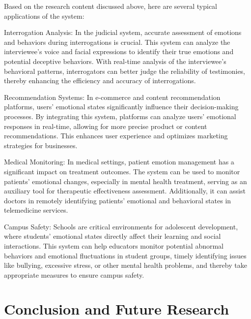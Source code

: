 \documentclass[preprint,12pt]{elsarticle}
\begin{document}
Based on the research content discussed above, here are several typical applications of the system:

Interrogation Analysis: In the judicial system, accurate assessment of emotions and behaviors during interrogations is crucial. This system can analyze the interviewee's voice and facial expressions to identify their true emotions and potential deceptive behaviors. With real-time analysis of the interviewee’s behavioral patterns, interrogators can better judge the reliability of testimonies, thereby enhancing the efficiency and accuracy of interrogations.

Recommendation Systems: In e-commerce and content recommendation platforms, users' emotional states significantly influence their decision-making processes. By integrating this system, platforms can analyze users' emotional responses in real-time, allowing for more precise product or content recommendations. This enhances user experience and optimizes marketing strategies for businesses.

Medical Monitoring: In medical settings, patient emotion management has a significant impact on treatment outcomes. The system can be used to monitor patients' emotional changes, especially in mental health treatment, serving as an auxiliary tool for therapeutic effectiveness assessment. Additionally, it can assist doctors in remotely identifying patients' emotional and behavioral states in telemedicine services.

Campus Safety: Schools are critical environments for adolescent development, where students' emotional states directly affect their learning and social interactions. This system can help educators monitor potential abnormal behaviors and emotional fluctuations in student groups, timely identifying issues like bullying, excessive stress, or other mental health problems, and thereby take appropriate measures to ensure campus safety.

\section{Conclusion and Future Research}
\end{document}
